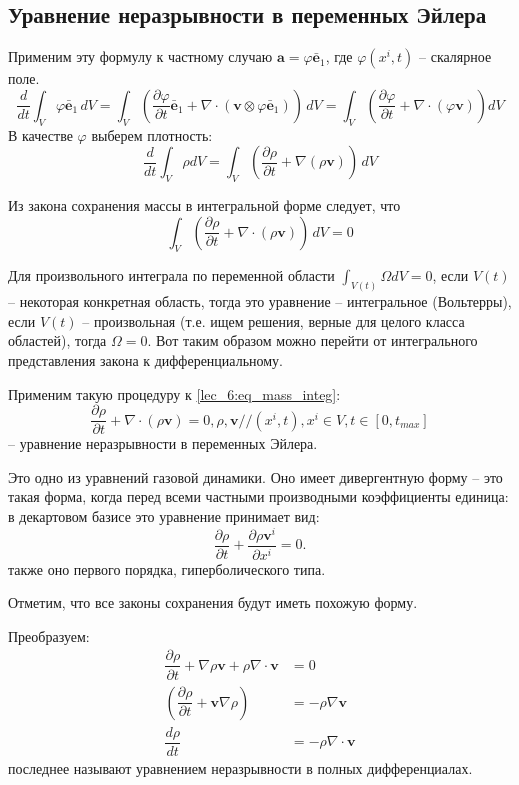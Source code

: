 \subsection{Уравнение неразрывности в переменных Эйлера}

Применим эту формулу к частному случаю $\mathbf{a} = \varphi \bar{\mathbf{e}}_1$, где
$\varphi(x^i, t)$ -- скалярное поле.
\[
  \dfrac{d}{dt} \int_V \varphi \bar{\mathbf{e}}_1 \, dV
  = \int_V \left( \dfrac{\partial \varphi}{\partial t} \bar{\mathbf{e}}_1 + \nabla \cdot \left( \mathbf{v} \otimes \varphi \bar{\mathbf{e}}_1 \right)  \right) \, dV
  = \int_V \left( \dfrac{\partial \varphi}{\partial t}  + \nabla \cdot (\varphi \mathbf{v}) \right) dV
\]
В качестве $\varphi$ выберем плотность:
\[
  \dfrac{d}{dt} \int_V \rho dV
  = \int_V \left( \dfrac{\partial \rho}{\partial t} + \nabla (\rho \mathbf{v}) \right) \, dV
\]

Из закона сохранения массы в интегральной форме следует, что 
\begin{equation}\label{lec_6:eq_mass_integ}
  \int_V \left( \dfrac{\partial \rho}{\partial t} + \nabla \cdot (\rho \mathbf{v}) \right) \, dV = 0
\end{equation}


Для произвольного интеграла по переменной области $\int_{V(t)} \Omega dV = 0$,
если $V(t)$ -- некоторая конкретная область, тогда это уравнение -- интегральное
(Вольтерры), если $V(t)$ -- произвольная (т.е. ищем решения, верные для целого класса
областей), тогда $\Omega = 0$. Вот таким образом можно перейти от интегрального
представления закона к дифференциальному.

Применим такую процедуру к \eqref{lec_6:eq_mass_integ}:
\[
  \dfrac{\partial \rho}{\partial t}  + \nabla \cdot (\rho \mathbf{v}) = 0, 
  \rho, \mathbf{v} // (x^i, t), x^i \in V, t \in [0, t_{max}]
\]
-- уравнение неразрывности в переменных Эйлера. 

Это одно из уравнений газовой динамики. Оно имеет дивергентную форму --
это такая форма, когда перед всеми частными производными коэффициенты единица:
в декартовом базисе это уравнение принимает вид:
\[
  \dfrac{\partial \rho}{\partial t}  + \dfrac{\partial \rho \mathbf{v}^i}{\partial x^i} = 0.
\]
также оно первого порядка, гиперболического типа.

Отметим, что все законы сохранения будут иметь похожую форму.

Преобразуем:
\begin{align*}
  \dfrac{\partial \rho}{\partial t} + \nabla \rho \mathbf{v} + \rho \nabla \cdot \mathbf{v} &= 0 \\
  \left( \dfrac{\partial \rho}{\partial t} + \mathbf{v} \nabla \rho \right) &= - \rho \nabla \mathbf{v} \\
  \dfrac{d \rho}{dt} &= - \rho \nabla \cdot \mathbf{v}
\end{align*}
последнее называют уравнением неразрывности в полных дифференциалах.


